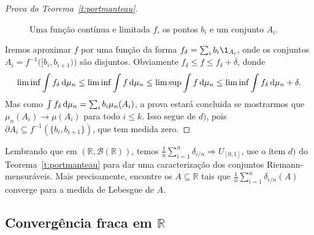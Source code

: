 \begin{topics}
\begin{proof}[Prova do Teorema~\ref{t:portmanteau}]
    \begin{figure}[!ht]
      \centering
      \caption{Uma função contínua e limitada $f$, os pontos $b_i$ e um conjunto $A_i$.}
    \end{figure}

    Iremos aproximar $f$ por uma função da forma $f_\delta = \sum_{i} b_i \1_{A_i}$, onde os conjuntos $A_i = f^{-1}\big( [b_i, b_{i+1}) \big)$ são disjuntos.
    Obviamente $f_\delta \leq f \leq f_\delta + \delta$, donde
    \begin{equation*}
      \liminf \int f_\delta \mathop{}\!\mathrm{d} \mu_n \leq \liminf \int f \mathop{}\!\mathrm{d} \mu_n \leq \limsup \int f \mathop{}\!\mathrm{d} \mu_n \leq \liminf \int f_\delta \mathop{}\!\mathrm{d} \mu_n + \delta.
    \end{equation*}
    Mas como $\int f_\delta \mathop{}\!\mathrm{d} \mu_n = \sum_i b_i \mu_n (A_i)$, a prova estará concluida se mostrarmos que $\mu_n (A_i) \to \mu(A_i)$ para todo $i \leq k$.
    Isso segue de $d)$, pois $\partial A_i \subseteq f^{-1}(\{b_i, b_{i+1}\})$, que tem medida zero.
  \end{proof}

  \begin{exercise}
    Lembrando que em $(\mathbb{R}, \mathcal{B}(\mathbb{R}))$, temos $\tfrac{1}{n} \sum_{i=1}^n \delta_{i/n} \Rightarrow U_{[0,1]}$, use o ítem $d)$ do Teorema~\ref{t:portmanteau} para dar uma caracterização dos conjuntos Riemann-mensuráveis.
    Mais precisamente, encontre os $A \subseteq \mathbb{R}$ tais que $\tfrac{1}{n} \sum_{i=1}^n \delta_{i/n}(A)$ converge para a medida de Lebesgue de $A$.
  \end{exercise}
\end{topics}

\subsection{Convergência fraca em \texorpdfstring{$\mathbb{R}$}{R}}

